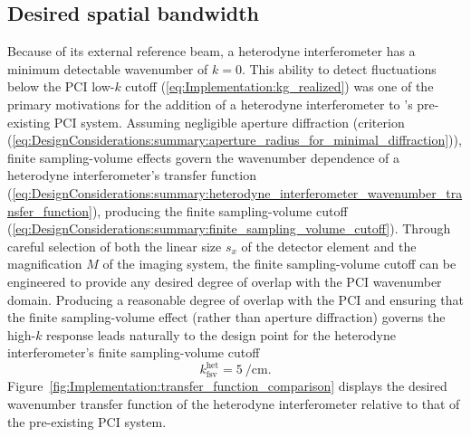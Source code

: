 \subsection{Desired spatial bandwidth}
\label{sec:Implementation:OpticalLayout:spatial_bandwidth}
Because of its external reference beam, a heterodyne interferometer
has a minimum detectable wavenumber of $k = 0$.
This ability to detect fluctuations
below the PCI low-$k$ cutoff (\ref{eq:Implementation:kg_realized})
was one of the primary motivations
for the addition of a heterodyne interferometer
to \diiid's pre-existing PCI system.
Assuming negligible aperture diffraction
(criterion (\ref{eq:DesignConsiderations:summary:aperture_radius_for_minimal_diffraction})),
finite sampling-volume effects govern the wavenumber dependence
of a heterodyne interferometer's transfer function
(\ref{eq:DesignConsiderations:summary:heterodyne_interferometer_wavenumber_transfer_function}),
producing the finite sampling-volume cutoff
(\ref{eq:DesignConsiderations:summary:finite_sampling_volume_cutoff}).
Through careful selection of both
the linear size $s_x$ of the detector element
and the magnification $M$ of the imaging system,
the finite sampling-volume cutoff can be engineered
to provide any desired degree of overlap
with the PCI wavenumber domain.
Producing a reasonable degree of overlap with the PCI and
ensuring that the finite sampling-volume effect
(rather than aperture diffraction)
governs the high-$k$ response
leads naturally to the design point for
the heterodyne interferometer's finite sampling-volume cutoff
\begin{equation}
  k_{\text{fsv}}^{\text{het}} = \SI{5}{\per\centi\meter}.
  \label{eq:Implementation:kfsv_interferometer_design}
\end{equation}
Figure~\ref{fig:Implementation:transfer_function_comparison}
displays the desired wavenumber transfer function
of the heterodyne interferometer relative to
that of the pre-existing PCI system.

